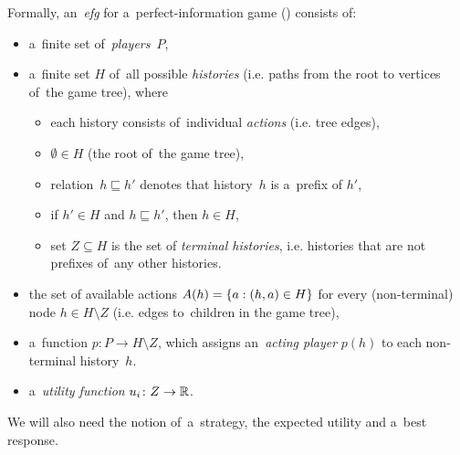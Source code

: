 Formally, an~\emph{\acrfull{efg}} for a~perfect-information game (\cite[p.~200]{Osborne1994course}) consists of:
\begin{itemize}
  \item a~finite set of~\emph{players}~$P$,

  \item a~finite set $H$ of~all possible \emph{histories} (i.e. paths from the root to vertices of~the game tree), where
    \begin{itemize}
      \item each history consists of~individual \emph{actions} (i.e. tree edges),
      \item $\emptyset \in H$ (the root of~the game tree),
      \item relation~$h \sqsubseteq h'$ denotes that history~$h$ is a~prefix of $h'$,
      \item if $h' \in H$ and $h \sqsubseteq h'$, then $h \in H$,
      \item set $Z \subseteq H$ is the set of \emph{terminal histories}, i.e. histories that are not prefixes of~any other histories.
    \end{itemize}

  \item the set of available actions $A(h) = \left\{ a: (h, a) \in H \right\}$ for every (non-terminal) node $h \in H \setminus Z$ (i.e. edges to~children in the game tree),

  \item a~function $p\colon P \to H \setminus Z$, which assigns an~\emph{acting player} $p(h)$ to each non-terminal history~$h$.

  \item a~\emph{utility function} $u_i\colon Z \rightarrow \mathbb{R}$.
\end{itemize}
We will also need the notion of~a~strategy, the expected utility and a~best response.
